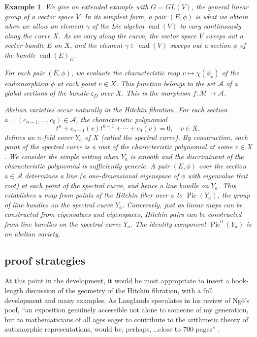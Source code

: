 \documentclass[brochure,english,12pt]{bourbaki}
\theoremstyle{plain}
\newtheorem{example}[equation]{Example}
\def\op#1{{\operatorname{#1}}}
\def\cc{\mathfrak{c}}
\def\A{{\mathcal A}}
\def\M{{\mathcal M}}
\begin{document}
\begin{example} We give an extended example with $G=GL(V)$, the
  general linear group of a vector space $V$.  In its simplest form, a
  pair $(E,\phi)$ is what we obtain when we allow an element $\gamma$ of
  the Lie algebra $\op{end}(V)$ to vary continuously along the curve
  $X$.  As we vary along the curve, the vector space $V$ sweeps out a
  vector bundle $E$ on $X$, and the element $\gamma\in\op{end}(V)$ sweeps
  out a section $\phi$ of the bundle $\op{end}(E)_D$.

  For each pair $(E,\phi)$, we evaluate the characteristic map
  $v\mapsto \chi(\phi_v)$ of the endomorphism $\phi$ at each point
  $v\in X$. This function belongs to the set $\A$ of a global sections
  of the bundle $\cc_D$ over $X$.  This is the morphism $f:{\M}\to
  {\A}$.

  {\it Abelian varieties} occur naturally in the Hitchin fibration.
  For each section $a=(c_{n-1},\ldots,c_0)\in \A$, the characteristic
  polynomial
\begin{equation}\label{eqn:spectral}
t^n + c_{n-1}(v) t^{n-1} + \cdots+ c_0(v)=0,\quad v\in X,
\end{equation} 
defines an $n$-fold cover $Y_a$ of $X$ (called the {\it spectral
  curve}).  By construction, each point of the spectral curve is a
root of the characteristic polynomial at some $v\in X$.  We consider
the simple setting when $Y_a$ is smooth and the discriminant of the
characteristic polynomial is sufficiently generic.  A pair $(E,\phi)$
over the section $a\in\A$ determines a line (a one-dimensional eigenspace
of $\phi$ with eigenvalue that root) at each point of the spectral
curve, and hence a line bundle on $Y_a$.  This establishes a map from
points of the Hitchin fiber over $a$ to $\op{Pic}(Y_a)$, the group of
line bundles on the spectral curve $Y_a$.  Conversely, just as linear
maps can be constructed from eigenvalues and eigenspaces, Hitchin
pairs can be constructed from line bundles on the spectral curve
$Y_a$.  The identity component $\op{Pic}^0(Y_a)$ is an abelian
variety.
\end{example}

\subsection{proof strategies}

At this point in the development, it would be most appropriate to
insert a book-length discussion of the geometry of the Hitchin
fibration, with a full development and many examples.  As Langlands
speculates in his review of Ng\^o's poof, ``an exposition genuinely
accessible not alone to someone of my generation, but to
mathematicians of all ages eager to contribute to the arithmetic
theory of automorphic representations, would be, perhaps, \ldots close
to 700 pages'' \cite{L:Ngo}.
\end{document}

